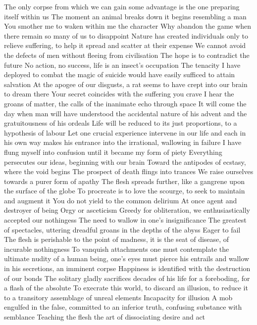 \documentclass{article}
\begin{document}
The only corpse from which we can gain some advantage is the one preparing itself within us
The moment an animal breaks down it begins resembling a man
You smother me to waken within me the character
Why abandon the game when there remain so many of us to disappoint
Nature has created individuals only to relieve suffering, to help it spread and scatter at their expense
We cannot avoid the defects of men without fleeing from civilisation
The hope is to contradict the future
No action, no success, life is an insect's occupation
The tenacity I have deployed to combat the magic of suicide would have easily sufficed to attain salvation
At the apogee of our disgusts, a rat seems to have crept into our brain to dream there
Your secret coincides with the suffering you crave
I hear the groans of matter, the calls of the inanimate echo through space
It will come the day when man will have understood the accidental nature of his advent and the gratuitousness of his ordeals
Life will be reduced to its just proportions, to a hypothesis of labour
Let one crucial experience intervene in our life and each in his own way makes his entrance into the irrational, wallowing in failure
I have flung myself into confusion until it became my form of piety
Everything persecutes our ideas, beginning with our brain
Toward the antipodes of ecstasy, where the void begins
The prospect of death flings into trances
We raise ourselves towards a purer form of apathy
The flesh spreads further, like a gangrene upon the surface of the globe
To procreate is to love the scourge, to seek to maintain and augment it
You do not yield to the common delirium
At once agent and destroyer of being
Orgy or asceticism
Greedy for obliteration, we enthusiastically accepted our nothingess
The need to wallow in one's insignificance
The greatest of spectacles, uttering dreadful groans in the depths of the abyss
Eager to fail
The flesh is perishable to the point of madness, it is the seat of disease, of incurable nothingness
To vanquish attachments one must contemplate the ultimate nudity of a human being, one's eyes must pierce his entrails and wallow in his secretions, an imminent corpse
Happiness is identified with the destruction of our bonds
The solitary gladly sacrifices decades of his life for a foreboding, for a flash of the absolute
To execrate this world, to discard an illusion, to reduce it to a transitory assemblage of unreal elements
Incapacity for illusion
A mob engulfed in the false, committed to an inferior truth, confusing substance with semblance
Teaching the flesh the art of dissociating desire and act
\end{document}

